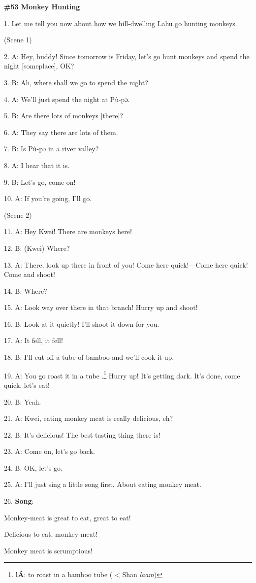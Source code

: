 
\textbf{\#53 Monkey Hunting}

1. Let me tell you now about how we hill-dwelling Lahu go hunting monkeys.

(Scene 1)

2. A: Hey, buddy!  Since tomorrow is Friday, let's go hunt monkeys and spend the
night [someplace], OK?

3. B: Ah, where shall we go to spend the night?

4. A: We'll just spend the night at Pù-pɔ.

5. B: Are there lots of monkeys [there]?

6. A: They say there are lots of them.

7. B: Is Pù-pɔ in a river valley?

8. A: I hear that it is.

9. B: Let's go, come on!

10. A: If you're going, I'll go.

(Scene 2)

11. A: Hey Kwei!  There are monkeys here!

12. B: (Kwei) Where?

13. A: There, look up there in front of you!  Come here quick!---Come here quick!
Come and shoot!

14. B: Where?

15. A: Look way over there in that branch!  Hurry up and shoot!

16. B: Look at it quietly!  I'll shoot it down for you.

17. A: It fell, it fell!

18. B: I'll cut off a tube of bamboo and we'll cook it up.

19. A: You go roast it in a tube .\footnote{\textbf{ lÁ}: to roast in a bamboo tube ( < Shan \textit{laam})}  Hurry up!  It's getting dark. It's done,
come quick, let's eat!

20. B: Yeah.

21. A: Kwei, eating monkey meat is really delicious, eh?

22. B: It's delicious!  The best tasting thing there is!

23. A: Come on, let's go back.

24. B: OK, let's go.

25. A: I'll just sing a little song first.  About eating monkey meat.

26. \textbf{Song}:

Monkey-meat is great to eat, great to eat!

Delicious to eat, monkey meat!

Monkey meat is scrumptious!

